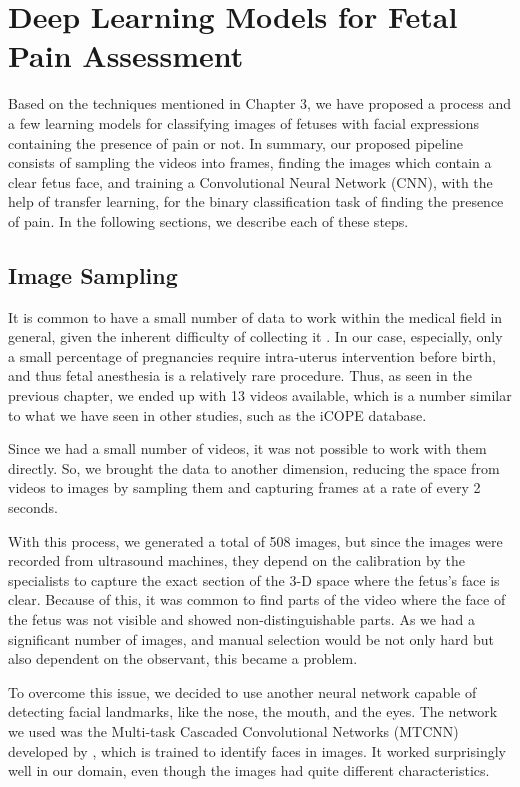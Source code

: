 \chapter{Deep Learning Models for Fetal Pain Assessment}

Based on the techniques mentioned in Chapter 3, we have proposed a process and a few learning models for classifying images of fetuses with facial expressions containing the presence of pain or not. In summary, our proposed pipeline consists of sampling the videos into frames, finding the images which contain a clear fetus face, and training a Convolutional Neural Network (CNN), with the help of transfer learning, for the binary classification task of finding the presence of pain. In the following sections, we describe each of these steps.

\section{Image Sampling}

It is common to have a small number of data to work within the medical field in general, given the inherent difficulty of collecting it \citep{abs-1908-00473}. In our case, especially, only a small percentage of pregnancies require intra-uterus intervention before birth, and thus fetal anesthesia is a relatively rare procedure. Thus, as seen in the previous chapter, we ended up with 13 videos available, which is a number similar to what we have seen in other studies, such as the iCOPE database.

Since we had a small number of videos, it was not possible to work with them directly. So, we brought the data to another dimension, reducing the space from videos to images by sampling them and capturing frames at a rate of every 2 seconds. 

With this process, we generated a total of 508 images, but since the images were recorded from ultrasound machines, they depend on the calibration by the specialists to capture the exact section of the 3-D space where the fetus's face is clear. Because of this, it was common to find parts of the video where the face of the fetus was not visible and showed non-distinguishable parts. As we had a significant number of images, and manual selection would be not only hard but also dependent on the observant, this became a problem.

To overcome this issue, we decided to use another neural network capable of detecting facial landmarks, like the nose, the mouth, and the eyes. The network we used was the Multi-task Cascaded Convolutional Networks (MTCNN) developed by \cite{ZhangZL016}, which is trained to identify faces in images. It worked surprisingly well in our domain, even though the images had quite different characteristics.


